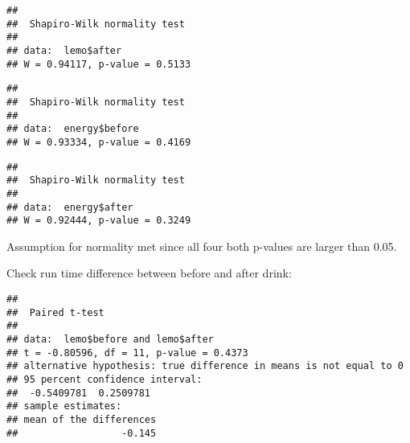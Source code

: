 \documentclass[
]{article}
\newenvironment{Shaded}{\begin{snugshade}}{\end{snugshade}}
\newcommand{\AttributeTok}[1]{\textcolor[rgb]{0.77,0.63,0.00}{#1}}
\newcommand{\CommentTok}[1]{\textcolor[rgb]{0.56,0.35,0.01}{\textit{#1}}}
\newcommand{\ConstantTok}[1]{\textcolor[rgb]{0.00,0.00,0.00}{#1}}
\newcommand{\FunctionTok}[1]{\textcolor[rgb]{0.00,0.00,0.00}{#1}}
\newcommand{\NormalTok}[1]{#1}
\newcommand{\SpecialCharTok}[1]{\textcolor[rgb]{0.00,0.00,0.00}{#1}}
\begin{document}
\begin{verbatim}
## 
##  Shapiro-Wilk normality test
## 
## data:  lemo$after
## W = 0.94117, p-value = 0.5133
\end{verbatim}

\begin{Shaded}
\end{Shaded}

\begin{verbatim}
## 
##  Shapiro-Wilk normality test
## 
## data:  energy$before
## W = 0.93334, p-value = 0.4169
\end{verbatim}

\begin{Shaded}
\end{Shaded}

\begin{verbatim}
## 
##  Shapiro-Wilk normality test
## 
## data:  energy$after
## W = 0.92444, p-value = 0.3249
\end{verbatim}

Assumption for normality met since all four both p-values are larger
than 0.05.

Check run time difference between before and after drink:

\begin{Shaded}
\end{Shaded}

\begin{verbatim}
## 
##  Paired t-test
## 
## data:  lemo$before and lemo$after
## t = -0.80596, df = 11, p-value = 0.4373
## alternative hypothesis: true difference in means is not equal to 0
## 95 percent confidence interval:
##  -0.5409781  0.2509781
## sample estimates:
## mean of the differences 
##                  -0.145
\end{verbatim}
\end{document}
